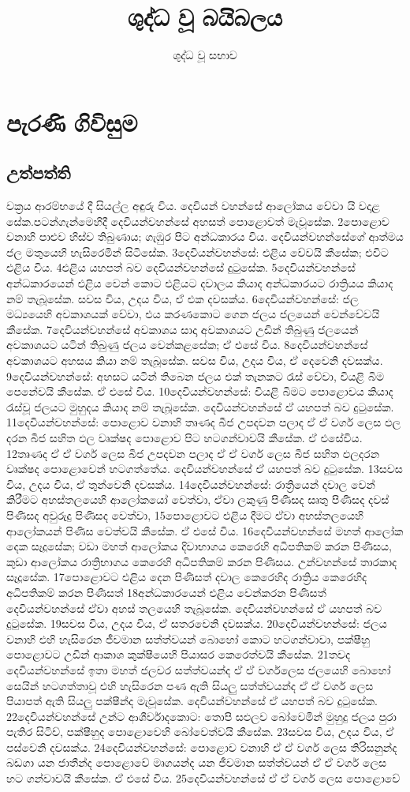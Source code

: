 \documentclass[10pt]{book}
\title{\bf ශුද්ධ වූ බයිබලය}
\author{ශුද්ධ වූ සභාව}
\begin{document}
                        
\frontmatter                            
\maketitle                              
\tableofcontents                        
\listoffigures
\listoftables
\mainmatter                             
\part{පැරණි ගිවිසුම}                   
\chapter{උත්පත්ති}                
වක්‍රය {ආරම්භයේ} දී සියල්ල අඳුරු විය. දෙවියන් වහන්සේ ආලෝකය වේවා යි වදාළ  සේක.පටන්ගැන්මෙහිදී දෙවියන්වහන්සේ අහසත් පොළොවත් මැවූසේක. 2පොළොව වනාහි පාළුව හිස්ව තිබුණාය; ගැඹුර පිට අන්ධකාරය විය. දෙවියන්වහන්සේගේ ආත්මය ජල මතුයෙහි හැසිරෙමින් සිටිසේක. 3දෙවියන්වහන්සේ: එළිය වේවයි කීසේක; එවිට එළිය විය. 4එළිය යහපත් බව දෙවියන්වහන්සේ දුටුසේක. 5දෙවියන්වහන්සේ අන්ධකාරයෙන් එළිය වෙන් කොට එළියට දවාලය කියාද අන්ධකාරයට රාත්‍රියය කියාද නම් තැබූසේක. සවස විය, උදය විය, ඒ එක දවසක්ය. 6දෙවියන්වහන්සේ: ජල මධ්‍යයෙහි අවකාශයක් වේවා, එය කරණකොට ගෙන ජලය ජලයෙන් වෙන්වේවයි කීසේක. 7දෙවියන්වහන්සේ අවකාශය සාදා අවකාශයට උඩින් තිබුණු ජලයෙන් අවකාශයට යටින් තිබුණු ජලය වෙන්කළසේක; ඒ එසේ විය. 8දෙවියන්වහන්සේ අවකාශයට අහසය කියා නම් තැබූසේක. සවස විය, උදය විය, ඒ දෙවෙනි දවසක්ය. 9දෙවියන්වහන්සේ: අහසට යටින් තිබෙන ජලය එක් තැනකට රැස් වේවා, වියළි බිම පෙනේවයි කීසේක. ඒ එසේ විය. 10දෙවියන්වහන්සේ: වියළි බිමට පොළොවය කියාද රැස්වූ ජලයට මුහුදය කියාද නම් තැබූසේක. දෙවියන්වහන්සේ ඒ යහපත් බව දුටුසේක. 11දෙවියන්වහන්සේ: පොළොව වනාහි තෘණද බීජ උපදවන පලාද ඒ ඒ වර්ග ලෙස ඵල දරන බීජ සහිත ඵල වෘක්ෂද පොළොව පිට හටගන්වාවයි කීසේක. ඒ එසේවිය. 12තෘණද ඒ ඒ වර්ග ලෙස බීජ උපදවන පලාද ඒ ඒ වර්ග ලෙස බීජ සහිත ඵලදරන වෘක්ෂද පොළොවෙන් හටගත්තේය. දෙවියන්වහන්සේ ඒ යහපත් බව දුටුසේක. 13සවස විය, උදය විය, ඒ තුන්වෙනි දවසක්ය. 14දෙවියන්වහන්සේ: රාත්‍රියෙන් දවාල වෙන් කිරීමට අහස්තලයෙහි ආලෝකයෝ වෙත්වා, ඒවා ලකුණු පිණිසද සෘතු පිණිසද දවස් පිණිසද අවුරුදු පිණිසද වෙත්වා, 15පොළොවට එළිය දීමට ඒවා අහස්තලයෙහි ආලෝකයන් පිණිස වෙත්වයි කීසේක. ඒ එසේ විය. 16දෙවියන්වහන්සේ මහත් ආලෝක දෙක සෑදූසේක; වඩා මහත් ආලෝකය දිවාභාගය කෙරෙහි අධිපතිකම් කරන පිණිසය, කුඩා ආලෝකය රාත්‍රිභාගය කෙරෙහි අධිපතිකම් කරන පිණිසය. උන්වහන්සේ තාරකාද සෑදූසේක. 17පොළොවට එළිය දෙන පිණිසත් දවාල කෙරෙහිද රාත්‍රිය කෙරෙහිද අධිපතිකම් කරන පිණිසත් 18අන්ධකාරයෙන් එළිය වෙන්කරන පිණිසත් දෙවියන්වහන්සේ ඒවා අහස් තලයෙහි තැබූසේක. දෙවියන්වහන්සේ ඒ යහපත් බව දුටුසේක. 19සවස විය, උදය විය, ඒ සතරවෙනි දවසක්ය. 20දෙවියන්වහන්සේ: ජලය වනාහි එහි හැසිරෙන ජීවමාන සත්ත්වයන් බොහෝ කොට හටගන්වාවා, පක්ෂීහු පොළොවට උඩින් ආකාශ කුක්ෂීයෙහි පියාසර කෙරෙත්වයි කීසේක. 21තවද දෙවියන්වහන්සේ ඉතා මහත් ජලචර සත්ත්වයන්ද ඒ ඒ වර්ගලෙස ජලයෙහි බොහෝ සෙයින් හටගත්තාවූ එහි හැසිරෙන පණ ඇති සියලු සත්ත්වයන්ද ඒ ඒ වර්ග ලෙස පියාපත් ඇති සියලු පක්ෂීන්ද මැවූසේක. දෙවියන්වහන්සේ ඒ යහපත් බව දුටුසේක. 22දෙවියන්වහන්සේ උන්ට ආශීර්වාදකොට: තොපි සඵලව බෝවෙමින් මුහුදු ජලය පුරා පැතිර සිටිව්, පක්ෂීහුද පොළොවෙහි බෝවෙත්වයි කීසේක. 23සවස විය, උදය විය, ඒ පස්වෙනි දවසක්ය. 24දෙවියන්වහන්සේ: පොළොව වනාහි ඒ ඒ වර්ග ලෙස තිරිසනුන්ද බඩගා යන ජාතීන්ද පොළොවේ මෘගයන්ද යන ජීවමාන සත්ත්වයන් ඒ ඒ වර්ග ලෙස හට ගන්වාවයි කීසේක. ඒ එසේ විය. 25දෙවියන්වහන්සේ ඒ ඒ වර්ග ලෙස පොළොවේ 
\end{document}
